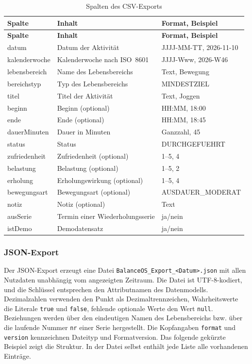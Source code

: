 \begin{longtable}{@{}L{3.5cm}L{7.0cm}L{4.7cm}@{}}
  \caption{Spalten des CSV-Exports}\label{tab:csv}\\
  \toprule
  \textbf{Spalte} & \textbf{Inhalt} & \textbf{Format, Beispiel} \\
  \midrule
  \endfirsthead
  \toprule
  \textbf{Spalte} & \textbf{Inhalt} & \textbf{Format, Beispiel} \\
  \midrule
  \endhead
  \bottomrule
  \endfoot
  datum & Datum der Aktivität & JJJJ-MM-TT, 2026-11-10 \\
  kalenderwoche & Kalenderwoche nach ISO~8601 & JJJJ-Www, 2026-W46 \\
  lebensbereich & Name des Lebensbereichs & Text, Bewegung \\
  bereichstyp & Typ des Lebensbereichs & MINDESTZIEL \\
  titel & Titel der Aktivität & Text, Joggen \\
  beginn & Beginn (optional) & HH:MM, 18:00 \\
  ende & Ende (optional) & HH:MM, 18:45 \\
  dauerMinuten & Dauer in Minuten & Ganzzahl, 45 \\
  status & Status & DURCHGEFUEHRT \\
  zufriedenheit & Zufriedenheit (optional) & 1--5, 4 \\
  belastung & Belastung (optional) & 1--5, 2 \\
  erholung & Erholungswirkung (optional) & 1--5, 4 \\
  bewegungsart & Bewegungsart (optional) & AUSDAUER\_MODERAT \\
  notiz & Notiz (optional) & Text \\
  ausSerie & Termin einer Wiederholungsserie & ja/nein \\
  istDemo & Demodatensatz & ja/nein \\
\end{longtable}

\subsubsection{JSON-Export}\label{sec:json}
Der JSON-Export erzeugt eine Datei \texttt{BalanceOS\_Export\_<Datum>.json} mit allen Nutzdaten unabhängig vom angezeigten Zeitraum. Die Datei ist UTF-8-kodiert, und die Schlüssel entsprechen den Attributnamen des Datenmodells. Dezimalzahlen verwenden den Punkt als Dezimaltrennzeichen, Wahrheitswerte die Literale \texttt{true} und \texttt{false}, fehlende optionale Werte den Wert \texttt{null}. Beziehungen werden über den eindeutigen Namen des Lebensbereichs bzw. über die laufende Nummer \texttt{nr} einer Serie hergestellt. Die Kopfangaben \texttt{format} und \texttt{version} kennzeichnen Dateityp und Formatversion. Das folgende gekürzte Beispiel zeigt die Struktur. In der Datei selbst enthält jede Liste alle vorhandenen Einträge.

